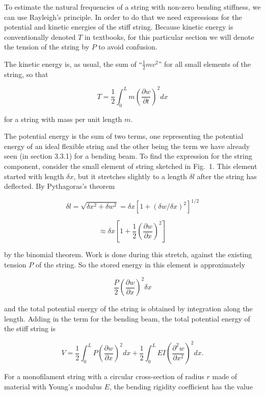   To estimate the natural frequencies of a string with non-zero bending 
  stiffness, we can use Rayleigh's principle. In order to do that we need 
  expressions for the potential and kinetic energies of the stiff string. 
  Because kinetic energy is conventionally denoted $T$ in textbooks, for this 
  particular section we will denote the tension of the string by $P$ to avoid 
  confusion. 

  The kinetic energy is, as usual, the sum of ``$\frac{1}{2}m v^2$'' for all 
  small elements of the string, so that 

  $$T=\frac{1}{2}\int_0^L{m \left(\frac{\partial w}{\partial t}\right)^2} dx 
  \tag{1}$$ 

  for a string with mass per unit length $m$. 


  The potential energy is the sum of two terms, one representing the potential 
  energy of an ideal flexible string and the other being the term we have 
  already seen (in section 3.3.1) for a bending beam. To find the expression 
  for the string component, consider the small element of string sketched in 
  Fig.\ 1. This element started with length $\delta x$, but it stretches 
  slightly to a length $\delta l$ after the string has deflected. By 
  Pythagoras's theorem 

  $$\delta l = \sqrt{\delta x^2 + \delta w^2}=\delta x [1+(\delta w / \delta 
  x)^2]^{1/2}$$ 

  $$\approx \delta x \left[1+ \frac{1}{2}\left(\dfrac{\partial w}{\partial 
  x}\right)^2 \right]\tag{2}$$ 

  by the binomial theorem. Work is done during this stretch, against the 
  existing tension $P$ of the string. So the stored energy in this element is 
  approximately 

  $$\frac{P}{2}\left(\dfrac{\partial w}{\partial x}\right)^2 \delta x \tag{3}$$ 

  and the total potential energy of the string is obtained by integration along 
  the length. Adding in the term for the bending beam, the total potential 
  energy of the stiff string is 

  $$V=\frac{1}{2}\int_0^L{P \left(\frac{\partial w}{\partial x}\right)^2} dx + 
  \frac{1}{2}\int_0^L{E I \left(\frac{\partial^2 w}{\partial x^2}\right)^2} dx 
  . \tag{4}$$ 

  For a monofilament string with a circular cross-section of radius $r$ made of 
  material with Young's modulus $E$, the bending rigidity coefficient has the 
  value 

